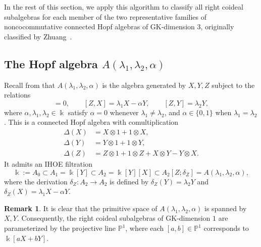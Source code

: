 \documentclass{article}
\theoremstyle{plain}
\theoremstyle{definition}
\newtheorem{remark}[thm]{Remark}
\numberwithin{equation}{section}
\begin{document}
	In the rest of this section, we apply this algorithm to classify all right coideal subalgebras for each member of the two representative families of noncocommutative connected Hopf algebras of GK-dimension $3$, originally classified by Zhuang~\cite{Zh13}. 
	
	\subsection{The Hopf algebra $A(\lambda_{1},\lambda_{2},\alpha)$} 
	\label{subsec:A-type}
	
	Recall from \cite{Zh13} that $A(\lambda_{1},\lambda_{2},\alpha)$ is the algebra generated by $X,Y,Z$ subject to the relations
	\begin{equation*}
		[X,Y]=0,\qquad [Z,X]=\lambda_{1} X-\alpha Y,\qquad [Z,Y]=\lambda_{2} Y,
	\end{equation*}
	where $\alpha,\lambda_{1},\lambda_{2}\in \Bbbk$ satisfy $\alpha=0$ whenever $\lambda_{1}\neq \lambda_{2}$, and $\alpha\in\{0,1\}$ when $\lambda_{1}=\lambda_{2}$. This is a connected Hopf algebra with comultiplication
	\begin{align*}
		\Delta(X)&=X\otimes1+1\otimes X,\\
		\Delta(Y)&=Y\otimes1+1\otimes Y,\\
		\Delta(Z)&=Z\otimes1+1\otimes Z+X\otimes Y-Y\otimes X.
	\end{align*}
	It admits an IHOE filtration
	\[
	\Bbbk :=A_{0}\subset  A_{1}=\Bbbk[Y] \subset  A_{2}=\Bbbk[Y][X] \subset
	A_{2}[Z;\delta_{Z}]=A(\lambda_{1},\lambda_{2},\alpha),
	\]
	where the derivation $\delta_{Z}\colon A_{2} \to A_{2}$ is defined by $\delta_{Z}(Y)=\lambda_{2} Y$ and $\delta_{Z}(X)=\lambda_{1} X-\alpha Y$.
	
	\begin{remark}
		It is clear that the primitive space of $A(\lambda_{1},\lambda_{2},\alpha)$ is spanned by $X,Y$. Consequently, the right coideal subalgebras of GK-dimension $1$ are parameterized by the projective line $\mathbb{P}^{1}$, where each $[a,b]\in \mathbb{P}^{1}$ corresponds to $\Bbbk[aX+bY]$.    
	\end{remark}
	
\end{document}
